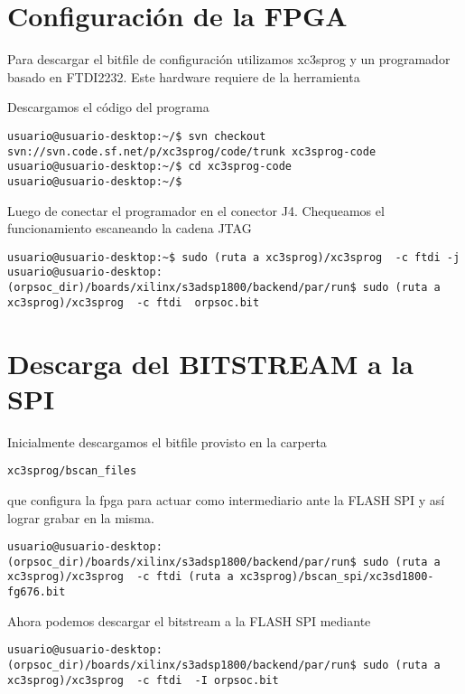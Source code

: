  \section{Configuración de la FPGA}

Para descargar el bitfile de configuración utilizamos xc3sprog y un programador basado en FTDI2232. Este hardware requiere de la herramienta 

Descargamos el código del programa
\begin{verbatim}
usuario@usuario-desktop:~/$ svn checkout svn://svn.code.sf.net/p/xc3sprog/code/trunk xc3sprog-code
usuario@usuario-desktop:~/$ cd xc3sprog-code
usuario@usuario-desktop:~/$   
\end{verbatim}



Luego de conectar el programador en el conector J4. Chequeamos el funcionamiento escaneando la cadena JTAG
\begin{verbatim}
usuario@usuario-desktop:~$ sudo (ruta a xc3sprog)/xc3sprog  -c ftdi -j
usuario@usuario-desktop:(orpsoc_dir)/boards/xilinx/s3adsp1800/backend/par/run$ sudo (ruta a xc3sprog)/xc3sprog  -c ftdi  orpsoc.bit 
\end{verbatim}

 \section{Descarga del BITSTREAM a la SPI }

Inicialmente descargamos el bitfile provisto en la carperta
\begin{verbatim}
xc3sprog/bscan_files
\end{verbatim} 
 que configura la fpga para actuar como intermediario ante la FLASH SPI y así lograr grabar en la misma.
\begin{verbatim}
usuario@usuario-desktop:(orpsoc_dir)/boards/xilinx/s3adsp1800/backend/par/run$ sudo (ruta a xc3sprog)/xc3sprog  -c ftdi (ruta a xc3sprog)/bscan_spi/xc3sd1800-fg676.bit 
\end{verbatim} 

Ahora podemos descargar el bitstream a la FLASH SPI mediante 
\begin{verbatim}
usuario@usuario-desktop:(orpsoc_dir)/boards/xilinx/s3adsp1800/backend/par/run$ sudo (ruta a xc3sprog)/xc3sprog  -c ftdi  -I orpsoc.bit 
\end{verbatim}